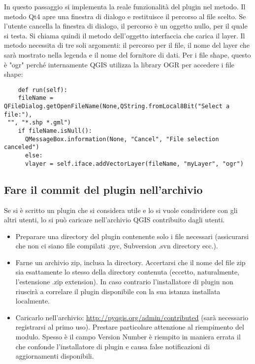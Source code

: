 
In questo passaggio si implementa la reale funzionalità del plugin nel
 metodo. Il metodo Qt4 
apre una finestra di dialogo e restituisce il percorso al file scelto. Se l'utente cancella la finestra di dialogo, il percorso è un oggetto nullo, per il quale si testa. Si chiama quindi il metodo  dell'oggetto interfaccia che carica il layer. Il metodo necessita di tre soli argomenti: il percorso per il file, il nome del layer che sarà mostrato nella legenda e il nome del fornitore di dati. Per i file shape, questo è "ogr" perché internamente QGIS utilizza la library OGR per accedere i file shape:

\begin{verbatim}
    def run(self):
    fileName = QFileDialog.getOpenFileName(None,QString.fromLocal8Bit("Select a file:"),
 "", "*.shp *.gml")
    if fileName.isNull():
      QMessageBox.information(None, "Cancel", "File selection canceled")
      else:
      vlayer = self.iface.addVectorLayer(fileName, "myLayer", "ogr")
\end{verbatim}


\subsection{Fare il commit del plugin nell'archivio}

Se si è scritto un plugin che si considera utile e lo si vuole condividere con gli altri utenti, lo si può caricare nell'archivio QGIS contribuito dagli utenti.
\begin{itemize}
\item Preparare una directory del plugin contenente solo i file necessari (assicurarsi che non ci siano file compilati .pyc, Subversion .svn directory ecc.).
\item Farne un archivio zip, inclusa la directory. Accertarsi che il nome del file zip sia esattamente lo stesso della directory contenuta (eccetto, naturalmente, l'estensione .zip extension).
In caso contrario l'installatore di plugin non riuscirà a correlare il plugin disponibile con la sua istanza installata localmente.
\item Caricarlo nell'archivio: \url{http://pyqgis.org/admin/contributed} (sarà necessario registrarsi al primo uso). Prestare particolare attenzione al riempimento del modulo. Spesso è il campo Version Number è riempito in maniera errata il che confonde l'installatore di plugin e causa false notificazioni di aggiornamenti disponibili.
\end{itemize}

